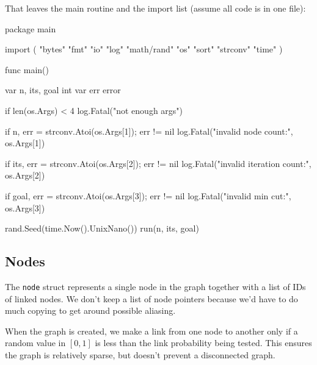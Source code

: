\documentclass[12pt,notitlepage]{article}
\begin{document}
That leaves the main routine and the import list (assume all code is in one file):
\begin{golang}
package main

import (
	"bytes"
	"fmt"
	"io"
	"log"
	"math/rand"
	"os"
	"sort"
	"strconv"
	"time"
)

func main() {
	var n, its, goal int
	var err error

	if len(os.Args) < 4 {
		log.Fatal("not enough args")
	}

	if n, err = strconv.Atoi(os.Args[1]); err != nil {
		log.Fatal("invalid node count:", os.Args[1])
	}

	if its, err = strconv.Atoi(os.Args[2]); err != nil {
		log.Fatal("invalid iteration count:", os.Args[2])
	}

	if goal, err = strconv.Atoi(os.Args[3]); err != nil {
		log.Fatal("invalid min cut:", os.Args[3])
	}

	rand.Seed(time.Now().UnixNano())
	run(n, its, goal)
}
\end{golang}

\subsection{Nodes}
The \verb|node| struct represents a single node in the graph together with a list
of IDs of linked nodes. We don't keep a list of node pointers because we'd have
to do much copying to get around possible aliasing.

When the graph is created, we make a link from one node to another only if a
random value in $[0,1]$ is less than the link probability being tested. This
ensures the graph is relatively sparse, but doesn't prevent a disconnected graph.
\end{document}

